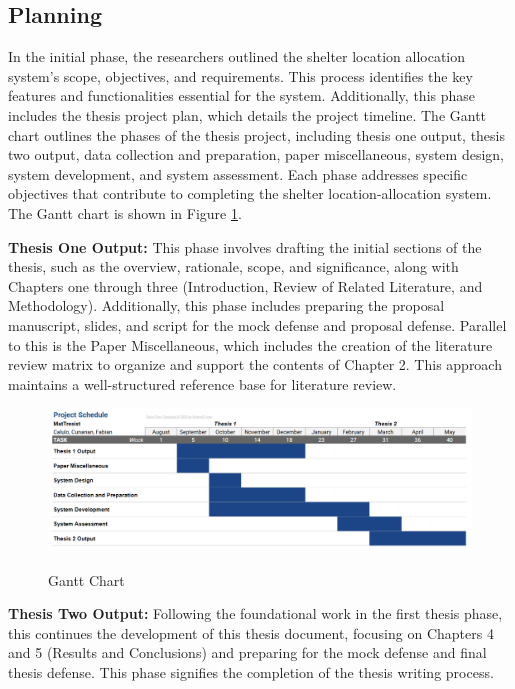 \subsection{Planning}

	In the initial phase, the researchers outlined the shelter location allocation system's scope, objectives, and requirements. This process identifies the key features and functionalities essential for the system. Additionally, this phase includes the thesis project plan, which details the project timeline.
	The Gantt chart outlines the phases of the thesis project, including thesis one output, thesis two output, data collection and preparation, paper miscellaneous, system design, system development, and system assessment. Each phase addresses specific objectives that contribute to completing the shelter location-allocation system. The Gantt chart is shown in Figure \ref{Gantt}.
	
	\textbf{Thesis One Output:} This phase involves drafting the initial sections of the thesis, such as the overview, rationale, scope, and significance, along with Chapters one through three (Introduction, Review of Related Literature, and Methodology). Additionally, this phase includes preparing the proposal manuscript, slides, and script for the mock defense and proposal defense. Parallel to this is the Paper Miscellaneous, which includes the creation of the literature review matrix to organize and support the contents of Chapter 2. This approach maintains a well-structured reference base for literature review.
	
	\begin{landscape}
		\begin{figure}[h]
			\caption{Gantt Chart}
			\centering
			\includegraphics[width=600px]{Gantt}
			\label{Gantt}
		\end{figure}
	\end{landscape}
	
	\textbf{Thesis Two Output:} Following the foundational work in the first thesis phase, this continues the development of this thesis document, focusing on Chapters 4 and 5 (Results and Conclusions) and preparing for the mock defense and final thesis defense. This phase signifies the completion of the thesis writing process.
	
